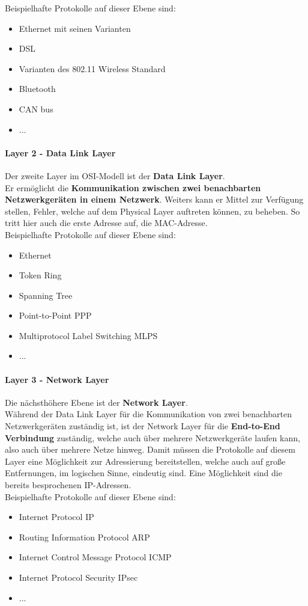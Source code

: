 \documentclass[12pt,a4paper]{report}
\begin{document}
\begin{onehalfspace}
Beispielhafte Protokolle auf dieser Ebene sind:
\begin{itemize}
\item Ethernet mit seinen Varianten
\item DSL 
\item Varianten des 802.11 Wireless Standard
\item Bluetooth
\item CAN bus
\item ...
\end{itemize}
\paragraph{Layer 2 - Data Link Layer}
Der zweite Layer im OSI-Modell ist der \textbf{Data Link Layer}.\\
Er ermöglicht die \textbf{Kommunikation zwischen zwei benachbarten Netzwerkgeräten in einem Netzwerk}. Weiters kann er Mittel zur Verfügung stellen, Fehler, welche auf dem Physical Layer auftreten können, zu beheben. So tritt hier auch die erste Adresse auf, die MAC-Adresse.\\

Beispielhafte Protokolle auf dieser Ebene sind:
\begin{itemize}
\item Ethernet
\item Token Ring
\item Spanning Tree 
\item Point-to-Point PPP
\item Multiprotocol Label Switching MLPS
\item ...
\end{itemize}
\paragraph{Layer 3 - Network Layer}
Die nächsthöhere Ebene ist der \textbf{Network Layer}.\\
Während der Data Link Layer für die Kommunikation von zwei benachbarten Netzwerkgeräten zuständig ist, ist der Network Layer für die \textbf{End-to-End Verbindung} zuständig, welche auch über mehrere Netzwerkgeräte laufen kann, also auch über mehrere Netze hinweg. Damit müssen die Protokolle auf diesem Layer eine Möglichkeit zur Adressierung bereitstellen, welche auch auf große Entfernungen, im logischen Sinne, eindeutig sind. Eine Möglichkeit sind die bereits besprochenen IP-Adressen.\\

Beispielhafte Protokolle auf dieser Ebene sind:
\begin{itemize}
\item Internet Protocol IP
\item Routing Information Protocol ARP
\item Internet Control Message Protocol ICMP
\item Internet Protocol Security IPsec
\item ...
\end{itemize}


\end{onehalfspace}
\end{document}
